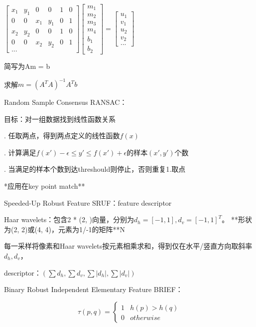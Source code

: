 \documentclass[UTF8]{ctexart}
\begin{document}
  \quad \quad \quad $
    \begin{bmatrix}
      x_1 & y_1 & 0 & 0 & 1 & 0 \\
      0 & 0 & x_1 & y_1 & 0 & 1 \\
      x_2 & y_2 & 0 & 0 & 1 & 0 \\
      0 & 0 & x_2 & y_2 & 0 & 1 \\
      ... 
      \end{bmatrix}
    \begin{bmatrix}
      m_1 \\
      m_2 \\
      m_3 \\ 
      m_4 \\
      b_1 \\
      b_2
      \end{bmatrix}
    =
    \begin{bmatrix}
      u_1 \\
      v_1 \\
      u_2 \\ 
      v_2 \\
      ...
      \end{bmatrix}$

  \quad \quad \quad 简写为Am = b

  \quad \quad \quad 求解$m = (A^TA)^{-1}A^Tb$

  Random Sample Consensus RANSAC：

  \quad 目标：对一组数据找到线性函数关系

  . 任取两点，得到两点定义的线性函数$f(x)$

  . 计算满足$f(x') - \epsilon \leq y' \leq f(x') + \epsilon$的样本$(x', y')$个数

  . 当满足的样本个数到达threshould则停止，否则重复1.取点

  \quad **应用在key point match**
  
  Speeded-Up Robust Feature SRUF：feature descriptor

  \quad Haar wavelets：包含2 * (2, )向量，分别为$d_h = [-1, 1], d_v = [-1, 1]^T$。 **形状为(2, 2)或(4, 4)，元素为1/-1的矩阵**N
  
  \quad 每一采样将像素和Haar wavelets按元素相乘求和，得到仅在水平/竖直方向取斜率$d_h, d_v$，

  \quad descriptor：$(\sum d_h, \sum d_v, \sum |d_h|, \sum |d_v|)$

  Binary Robust Independent Elementary Feature BRIEF：

  \quad \begin{equation*}
      \tau(p, q) = \begin{cases}
      1 & h(p) > h(q)\\
      0 & otherwise
      \end{cases}
    \end{equation*}
\end{document}
